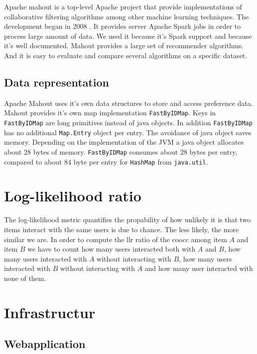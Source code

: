 Apache mahout is a top-level Apache project that provide implementations of collaborative filtering algorithms among other machine learning techniques. The development began in 2008 \cite{Owen}. It provides server Apache Spark jobs in order to process large amount of data. We used it because it's Spark support and because it's well documented.
Mahout provides a large set of recommender algorithms. And it is easy to evaluate and compare several algorithms on a specific dataset.

\subsection{Data representation}
\label{sec:datarepresentation}

Apache Mahout uses it's own data structures to store and access preference data. Mahout provides it's own map implementation \verb|FastByIDMap|. Keys in \verb|FastByIDMap| are long primitives instead of java objects. In addition \verb|FastByIDMap| has no additional \verb|Map.Entry| object per entry. The avoidance of java object saves memory. Depending on the implementation of the JVM a java object allocates about 28 bytes of memory. \verb|FastByIDMap| consumes about 28 bytes per entry, compared to about 84 byte per entry for \verb|HashMap| from \verb|java.util|.

\section{Log-likelihood ratio}
\label{sec:llrratio}
The log-likelihood metric quantifies the propability of how
unlikely it is that two items interact with the same users is due to chance. The less likely, the more similar we are.
In order to compute the \gls{llr} ratio of the \gls{coocc} among item $A$ and item $B$ we have to count how many users interacted both with $A$ and $B$, how many users interacted with $A$ without interacting with $B$, how many users interacted with $B$ without interacting with $A$ and how many user interacted with none of them.


\section{Infrastructur}
\label{sec:infrastructur}

\subsection{Webapplication}
\label{sec:web}


